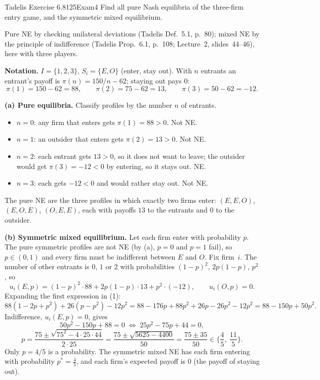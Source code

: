 \begin{exsol}{Tadelis Exercise 6.8}{125}{Exam}{4}
\asked Find all pure Nash equilibria of the three-firm entry game, and the symmetric mixed equilibrium.

\method Pure NE by checking unilateral deviations (Tadelis Def.~5.1, p.~80); mixed NE by the
principle of indifference (Tadelis Prop.~6.1, p.~108; Lecture~2, slides~44--46), here with three
players.

\solution
\textbf{Notation.} $I = \{1,2,3\}$, $S_i = \{E, O\}$ (enter, stay out). With $n$ entrants an
entrant's payoff is $\pi(n) = 150/n - 62$; staying out pays $0$:
\[
  \pi(1) = 150 - 62 = 88, \qquad \pi(2) = 75 - 62 = 13, \qquad \pi(3) = 50 - 62 = -12 .
\]

\textbf{(a) Pure equilibria.} Classify profiles by the number $n$ of entrants.
\begin{itemize}
  \item $n = 0$: any firm that enters gets $\pi(1) = 88 > 0$. Not NE.
  \item $n = 1$: an outsider that enters gets $\pi(2) = 13 > 0$. Not NE.
  \item $n = 2$: each entrant gets $13 > 0$, so it does not want to leave; the outsider would get
  $\pi(3) = -12 < 0$ by entering, so it stays out. NE.
  \item $n = 3$: each gets $-12 < 0$ and would rather stay out. Not NE.
\end{itemize}
The pure NE are the three profiles in which exactly two firms enter:
$(E,E,O)$, $(E,O,E)$, $(O,E,E)$, each with payoffs $13$ to the entrants and $0$ to the outsider.

\textbf{(b) Symmetric mixed equilibrium.} Let each firm enter with probability $p$. The pure
symmetric profiles are not NE (by (a), $p = 0$ and $p = 1$ fail), so $p \in (0,1)$ and every firm
must be indifferent between $E$ and $O$. Fix firm~$i$. The number of other entrants is $0$, $1$ or
$2$ with probabilities $(1-p)^2$, $2p(1-p)$, $p^2$, so
\[
  u_i(E, p) = (1-p)^2\cdot 88 + 2p(1-p)\cdot 13 + p^2\cdot(-12), \qquad u_i(O, p) = 0. \tag{1}
\]
Expanding the first expression in (1):
\[
  88(1 - 2p + p^2) + 26(p - p^2) - 12p^2 = 88 - 176p + 88p^2 + 26p - 26p^2 - 12p^2
  = 88 - 150p + 50p^2 .
\]
Indifference, $u_i(E,p) = 0$, gives
\[
  50p^2 - 150p + 88 = 0 \;\Longleftrightarrow\; 25p^2 - 75p + 44 = 0,
\]
\[
  p = \frac{75 \pm \sqrt{75^2 - 4\cdot 25\cdot 44}}{2\cdot 25}
    = \frac{75 \pm \sqrt{5625 - 4400}}{50} = \frac{75 \pm 35}{50} \in \Big\{\frac45,\ \frac{11}{5}\Big\}.
\]
Only $p = 4/5$ is a probability. The symmetric mixed NE has each firm entering with probability
$p^* = \tfrac45$, and each firm's expected payoff is $0$ (the payoff of staying out).


\end{exsol}

